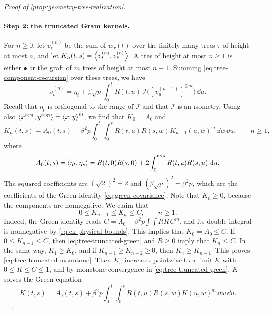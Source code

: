 \begin{proof}[Proof of \cref{prop:geometry-tree-realization}]
\paragraph{Step 2: the truncated Gram kernels.}
For $n\ge0$, let $v^{(n)}_t$ be the sum of $w_\tau(t)$ over the finitely many trees $\tau$ of height at most $n$, and let $K_n(t,s)=\left\langle v^{(n)}_t,v^{(n)}_s\right\rangle$. A tree of height at most $n\ge1$ is either $\bullet$ or the graft of $m$ trees of height at most $n-1$. Summing \eqref{eq:tree-component-recursion} over these trees, we have
\[
 v^{(n)}_t=\eta_t+\beta\sqrt p\int_0^tR(t,u)\,\mathcal I\bigl((v^{(n-1)}_u)^{\otimes m}\bigr)\,\dd u.
\]
Recall that $\eta_t$ is orthogonal to the range of $\mathcal I$ and that $\mathcal I$ is an isometry. Using also $\left\langle x^{\otimes m},y^{\otimes m}\right\rangle=\left\langle x,y\right\rangle^m$, we find that $K_0=A_0$ and
\begin{equation}\label{eq:tree-truncated-green}
 K_n(t,s)=A_0(t,s)+\beta^2p\int_0^t\int_0^sR(t,u)R(s,w)K_{n-1}(u,w)^m\,\dd w\,\dd u,\qquad n\ge1,
\end{equation}
where
\[
 A_0(t,s)=\left\langle\eta_t,\eta_s\right\rangle=R(t,0)R(s,0)+2\int_0^{t\wedge s}R(t,u)R(s,u)\,\mathop{}\!\mathrm d u.
\]
The squared coefficients are $(\sqrt2)^2=2$ and $(\beta\sqrt p)^2=\beta^2p$, which are the coefficients of the Green identity \eqref{eq:green-covariance}. Note that $K_n\ge0$, because the components are nonnegative. We claim that
\begin{equation}\label{eq:tree-truncated-monotone}
 0\le K_{n-1}\le K_n\le C,\qquad n\ge1.
\end{equation}
Indeed, the Green identity reads $C=A_0+\beta^2p\int\!\!\int RR\,C^m$, and its double integral is nonnegative by \eqref{eq:ck-physical-bounds}. This implies that $K_0=A_0\le C$. If $0\le K_{n-1}\le C$, then \eqref{eq:tree-truncated-green} and $R\ge0$ imply that $K_n\le C$. In the same way, $K_1\ge K_0$, and if $K_{n-1}\ge K_{n-2}\ge0$, then $K_n\ge K_{n-1}$. This proves \eqref{eq:tree-truncated-monotone}. Then $K_n$ increases pointwise to a limit $K$ with $0\le K\le C\le1$, and by monotone convergence in \eqref{eq:tree-truncated-green}, $K$ solves the Green equation
\begin{equation}\label{eq:tree-green-equation}
 K(t,s)=A_0(t,s)+\beta^2p\int_0^t\int_0^sR(t,u)R(s,w)K(u,w)^m\,\dd w\,\dd u.
\end{equation}


\end{proof}
